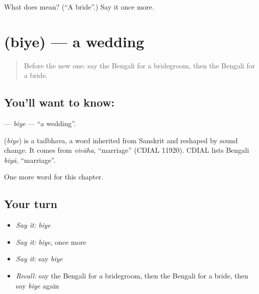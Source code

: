 \begin{tcolorbox}[breakable,colback=teal!4,colframe=teal!35!black,title={Before you move on}]
What does  mean? (\textquotedblleft{}A bride\textquotedblright{}.) Say it once more.
\end{tcolorbox}
\section[\texorpdfstring{\bn{বিয়ে} (biye)}{বিয়ে (biye)}]{ (biye) — a wedding}

\label{lesson:BN-C168-biye}



\begin{quote}
Before the new one: say the Bengali for a bridegroom, then the Bengali for a bride.
\end{quote}

\subsection*{You'll want to know: }
\textbf{} — \emph{biye} — \textquotedblleft{}a wedding\textquotedblright{}.

\begin{cousinweb}
\textbf{} (\emph{biye}) is a tadbhava, a word inherited from Sanskrit and reshaped by sound change. It comes from \emph{vivāha}, \textquotedblleft{}marriage\textquotedblright{} (CDIAL 11920). CDIAL lists Bengali \emph{biyā}, \textquotedblleft{}marriage\textquotedblright{}.
\end{cousinweb}

\begin{grammarlens}[title={What you've built}]
One more word for this chapter.
\end{grammarlens}

\subsection*{Your turn}
\begin{itemize}
\raggedright
  \item \emph{Say it:} \emph{biye}
  \item \emph{Say it:} \emph{biye}, once more
  \item \emph{Say it:} say \emph{biye}
  \item \emph{Recall:} say the Bengali for a bridegroom, then the Bengali for a bride, then say \emph{biye} again
\end{itemize}

